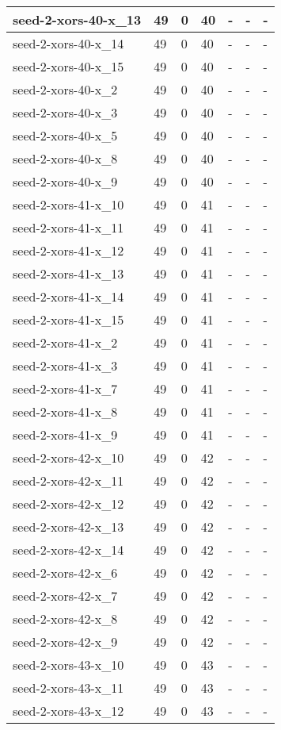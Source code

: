\begin{scriptsize}
\begin{longtable}{|p{5cm}|l|l|l|l|l|l|}
seed-2-xors-40-x\_13&49&0&40&-&-&- \\ \hline 
seed-2-xors-40-x\_14&49&0&40&-&-&- \\ \hline 
seed-2-xors-40-x\_15&49&0&40&-&-&- \\ \hline 
seed-2-xors-40-x\_2&49&0&40&-&-&- \\ \hline 
seed-2-xors-40-x\_3&49&0&40&-&-&- \\ \hline 
seed-2-xors-40-x\_5&49&0&40&-&-&- \\ \hline 
seed-2-xors-40-x\_8&49&0&40&-&-&- \\ \hline 
seed-2-xors-40-x\_9&49&0&40&-&-&- \\ \hline 
seed-2-xors-41-x\_10&49&0&41&-&-&- \\ \hline 
seed-2-xors-41-x\_11&49&0&41&-&-&- \\ \hline 
seed-2-xors-41-x\_12&49&0&41&-&-&- \\ \hline 
seed-2-xors-41-x\_13&49&0&41&-&-&- \\ \hline 
seed-2-xors-41-x\_14&49&0&41&-&-&- \\ \hline 
seed-2-xors-41-x\_15&49&0&41&-&-&- \\ \hline 
seed-2-xors-41-x\_2&49&0&41&-&-&- \\ \hline 
seed-2-xors-41-x\_3&49&0&41&-&-&- \\ \hline 
seed-2-xors-41-x\_7&49&0&41&-&-&- \\ \hline 
seed-2-xors-41-x\_8&49&0&41&-&-&- \\ \hline 
seed-2-xors-41-x\_9&49&0&41&-&-&- \\ \hline 
seed-2-xors-42-x\_10&49&0&42&-&-&- \\ \hline 
seed-2-xors-42-x\_11&49&0&42&-&-&- \\ \hline 
seed-2-xors-42-x\_12&49&0&42&-&-&- \\ \hline 
seed-2-xors-42-x\_13&49&0&42&-&-&- \\ \hline 
seed-2-xors-42-x\_14&49&0&42&-&-&- \\ \hline 
seed-2-xors-42-x\_6&49&0&42&-&-&- \\ \hline 
seed-2-xors-42-x\_7&49&0&42&-&-&- \\ \hline 
seed-2-xors-42-x\_8&49&0&42&-&-&- \\ \hline 
seed-2-xors-42-x\_9&49&0&42&-&-&- \\ \hline 
seed-2-xors-43-x\_10&49&0&43&-&-&- \\ \hline 
seed-2-xors-43-x\_11&49&0&43&-&-&- \\ \hline 
seed-2-xors-43-x\_12&49&0&43&-&-&- \\ \hline 

\end{longtable}
\end{scriptsize}
